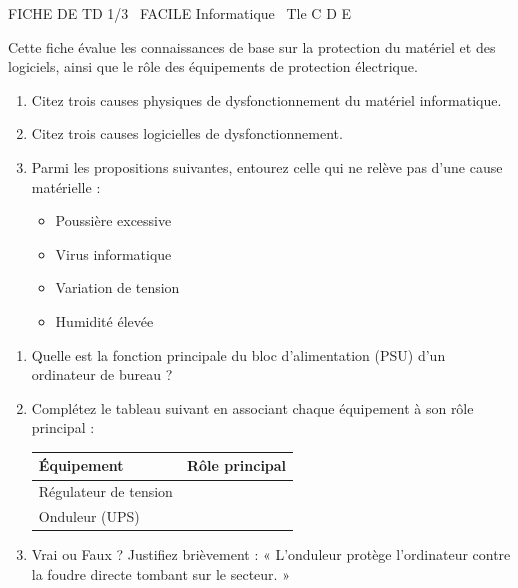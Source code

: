 \documentclass[11pt]{article}
\begin{document}
\begin{tcolorbox}[enhanced,colback=popink,colframe=popink,arc=10pt,boxrule=0pt,left=12pt,right=12pt,top=9pt,bottom=9pt]
{\color{white}\popxbold\small FICHE DE TD 1/3 \textbullet\ FACILE \hfill Informatique \textbullet\ Tle C D E\par}
\end{tcolorbox}
\vspace{4pt}
Cette fiche évalue les connaissances de base sur la protection du matériel et des logiciels, ainsi que le rôle des équipements de protection électrique.

\begin{exercice}
\begin{enumerate}
    \item Citez trois causes physiques de dysfonctionnement du matériel informatique.
    \item Citez trois causes logicielles de dysfonctionnement.
    \item Parmi les propositions suivantes, entourez celle qui ne relève pas d'une cause matérielle : 
    \begin{itemize}
        \item Poussière excessive
        \item Virus informatique
        \item Variation de tension
        \item Humidité élevée
    \end{itemize}
\end{enumerate}
\end{exercice}

\begin{exercice}
\begin{enumerate}
    \item Quelle est la fonction principale du bloc d'alimentation (PSU) d'un ordinateur de bureau ?
    \item Complétez le tableau suivant en associant chaque équipement à son rôle principal :
    \begin{tabular}{|l|p{8cm}|}
    \hline
    \textbf{Équipement} & \textbf{Rôle principal} \\ \hline
    Régulateur de tension & \\ \hline
    Onduleur (UPS) & \\ \hline
    \end{tabular}
    \item Vrai ou Faux ? Justifiez brièvement : « L'onduleur protège l'ordinateur contre la foudre directe tombant sur le secteur. »
\end{enumerate}
\end{exercice}
\end{document}
